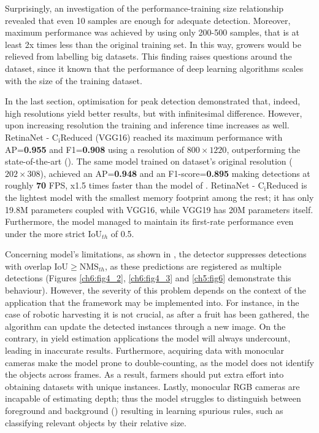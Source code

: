 Surprisingly, an investigation of the performance-training size relationship revealed that even 10 samples are enough for adequate detection. Moreover, maximum performance was achieved by using only 200-500 samples, that is at least 2x times less than the original training set. In this way, growers would be relieved from labelling big datasets. This finding raises questions around the dataset, since it known that the performance of deep learning algorithms scales with the size of the training dataset.

In the last section, optimisation for peak detection demonstrated that, indeed, high resolutions yield better results, but with infinitesimal difference. However, upon increasing resolution the training and inference time increases as well. RetinaNet - $\text{C}_\text{i}\text{Reduced}$ (VGG16) reached its maximum performance with AP=\textbf{0.955} and F1=\textbf{0.908} using a resolution of $800\times1220$, outperforming the state-of-the-art (\cite{bargoti2017deep}). The same model trained on dataset's original resolution ($202\times308$), achieved an AP=\textbf{0.948} and an F1-score=\textbf{0.895} making detections at roughly \textbf{70} FPS, x1.5 times faster than the model of \cite{liang2018apple}. RetinaNet - $\text{C}_\text{i}\text{Reduced}$ is the lightest model with the smallest memory footprint among the rest; it has only 19.8M parameters coupled with VGG16, while VGG19 has 20M parameters itself. Furthermore, the model managed to maintain its first-rate performance even under the more strict $\text{IoU}_{th}$ of 0.5.

Concerning model's limitations, as shown in , the detector suppresses detections with overlap $\text{IoU}\geq\text{NMS}_{th}$, as these predictions are registered as multiple detections (Figures \ref{ch6:fig4_2}, \ref{ch6:fig4_3} and \ref{ch5:fig6} demonstrate this behaviour). However, the severity of this problem depends on the context of the application that the framework may be implemented into. For instance, in the case of robotic harvesting it is not crucial, as after a fruit has been gathered, the algorithm can update the detected instances through a new image. On the contrary, in yield estimation applications the model will always undercount, leading in inaccurate results. Furthermore, acquiring data with monocular cameras make the model prone to double-counting, as the model does not identify the objects across frames. As a result, farmers should put extra effort into obtaining datasets with unique instances. Lastly, monocular RGB cameras are incapable of estimating depth; thus the model struggles to distinguish between foreground and background () resulting in learning spurious rules, such as classifying relevant objects by their relative size.

